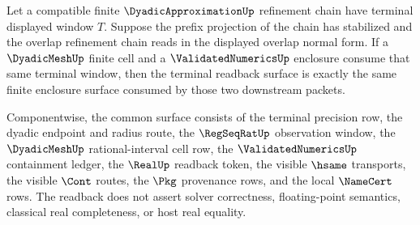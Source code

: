 \begin{theorem}
\label{thm:dyadicapproximation-terminal-validated-enclosure-readback}
Let a compatible finite $\DyadicApproximationUp$ refinement chain have terminal
displayed window $T$. Suppose the prefix projection of the chain has stabilized
and the overlap refinement chain reads in the displayed overlap normal form. If
a $\DyadicMeshUp$ finite cell and a $\ValidatedNumericsUp$ enclosure consume
that same terminal window, then the terminal readback surface is exactly the
same finite enclosure surface consumed by those two downstream packets.

Componentwise, the common surface consists of the terminal precision row, the
dyadic endpoint and radius route, the $\RegSeqRatUp$ observation window, the
$\DyadicMeshUp$ rational-interval cell row, the $\ValidatedNumericsUp$
containment ledger, the $\RealUp$ readback token, the visible $\hsame$
transports, the visible $\Cont$ routes, the $\Pkg$ provenance rows, and the
local $\NameCert$ rows. The readback does not assert solver correctness,
floating-point semantics, classical real completeness, or host real equality.
\end{theorem}
